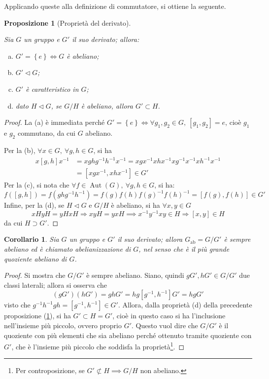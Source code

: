 \documentclass[11pt]{article}
\theoremstyle{style}
\newtheorem{prop}{Proposizione}[section]
\newtheorem{corollario}{Corollario}[teorema]
\numberwithin{equation}{subsection}
\begin{document}
Applicando queste alla definizione di commutatore, si ottiene la seguente.
\begin{prop}[Propriet\`a del derivato]\label{propderiv}
	
	Sia $G$ un gruppo e $G'$ il suo derivato; allora:
	\begin{enumerate}[(a).]
		\item $G ' = \left\{ e \right\}  \iff G$ \`e abeliano;
		\item $G' \lhd G$;
		\item $G'$ \`e caratteristico in $G$;
		\item dato $H \lhd G$, se $G / H$ \`e abeliano, allora $G' \subset H$.
	\end{enumerate}
\end{prop}
	\begin{proof}
		La (a) \`e immediata perch\'e $G' = \left\{ e \right\} \iff \forall g_1,g_2 \in G, \ [g_1,g_2] = e $, cio\`e $g_1$ e $g_2$ commutano, da cui $G$ abeliano.

		Per la (b), $\forall x \in G, \ \forall g,h \in G $, si ha 
		\[
			\begin{split}
				x[g,h]x^{-1}  &= xghg^{-1}h^{-1}x^{-1}= xgx^{-1}xhx^{-1}xg^{-1}x^{-1}xh^{-1}x^{-1}\\
					      &=[xgx^{-1}, xhx^{-1}] \in G'
			\end{split}
		\] 
	Per la (c), si nota che $\forall f \in \operatorname{Aut} (G), \ \forall g,h \in G$, si ha:
	\[
		f([g,h]) = f(ghg^{-1}h^{-1}) = f(g) f(h) f(g)^{-1} f(h)^{-1} = [f(g), f(h)] \in G'
	\] 
	Infine, per la (d), se $H \lhd G$ e $G / H$ \`e abeliano, si ha $\forall x,y \in G$
	\[
		xHyH =yH xH\Rightarrow xyH = yxH \implies x^{-1}y^{-1}xy \in H \Rightarrow [x,y] \in H
	\] 
	da cui $H \supset G' $.
	\end{proof}
\begin{corollario}
	Sia $G$ un gruppo e $G'$ il suo derivato; allora $G_\text{ab}= G / G'$ \`e sempre abeliano ed \`e chiamato \textit{abelianizzazione} di $G$, nel senso che \`e il pi\`u grande quoziente abeliano di $G$.
\end{corollario}
	\begin{proof}
		Si mostra che $G / G'$ \`e sempre abeliano. 
		Siano, quindi $gG', hG' \in G / G'$ due classi laterali; allora si osserva che
		\[
			(gG') (hG') = ghG' = hg [g^{-1},h^{-1}] G' = hg G'
		\] 
		visto che $g^{-1}h^{-1}gh=[g^{-1},h^{-1}] \in G'$.
		Allora, dalla propriet\`a (d) della precedente proposizione (\ref{propderiv}), si ha $G' \subset H =G'$, cio\`e in questo caso si ha l'inclusione nell'insieme pi\`u piccolo, ovvero proprio $G'$. 
		Questo vuol dire che $G /G'$ \`e il quoziente con pi\`u elementi che sia abeliano perch\'e ottenuto tramite quoziente con $G'$, che \`e l'insieme pi\`u piccolo che soddisfa la propriet\`a\footnote{Per controposizione, se $G'\not\subset H\implies G/H$ non abeliano.}.
	\end{proof}
\end{document}
